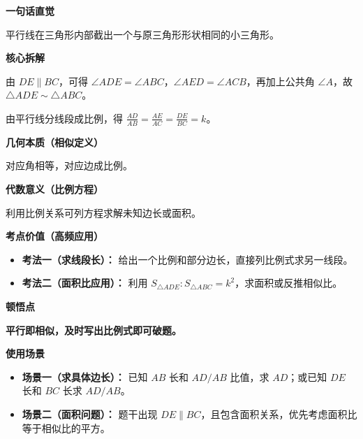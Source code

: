 \begin{explanationbox}

	\textbf{\textcolor{CExplanation}{一句话直觉}}

	平行线在三角形内部截出一个与原三角形形状相同的小三角形。

	\medskip
	\textbf{\textcolor{CExplanation}{核心拆解}}
	\begin{description}[style=nextline, leftmargin=2.8em, labelsep=0.5em, itemsep=0.45em]
		\item[\textbf{要点一（平行得角等）：}] 由 $DE\parallel BC$，可得 $\angle ADE=\angle ABC$，$\angle AED=\angle ACB$，再加上公共角 $\angle A$，故 $\triangle ADE\sim\triangle ABC$。
		\item[\textbf{要点二（比例线段）：}] 由平行线分线段成比例，得 $\frac{AD}{AB}=\frac{AE}{AC}=\frac{DE}{BC}=k$。
	\end{description}

	\medskip
	\textbf{\textcolor{CExplanation}{几何本质（相似定义）}}

	对应角相等，对应边成比例。

	\medskip
	\textbf{\textcolor{CExplanation}{代数意义（比例方程）}}

	利用比例关系可列方程求解未知边长或面积。

	\medskip
	\textbf{\textcolor{CExplanation}{考点价值（高频应用）}}
	\begin{itemize}[leftmargin=*, itemsep=0.5em, topsep=0.4em]
		\item \textbf{考法一（求线段长）：} 给出一个比例和部分边长，直接列比例式求另一线段。
		\item \textbf{考法二（面积比应用）：} 利用 $S_{\triangle ADE}:S_{\triangle ABC}=k^2$，求面积或反推相似比。
	\end{itemize}

	\medskip
	\textbf{\textcolor{CExplanation}{顿悟点}}

	\textbf{平行即相似，及时写出比例式即可破题。}

	\medskip
	\textbf{\textcolor{CExplanation}{使用场景}}
	\begin{itemize}[leftmargin=*, itemsep=0.5em, topsep=0.4em]
		\item \textbf{场景一（求具体边长）：} 已知 $AB$ 长和 $AD/AB$ 比值，求 $AD$；或已知 $DE$ 长和 $BC$ 长求 $AD/AB$。
		\item \textbf{场景二（面积问题）：} 题干出现 $DE\parallel BC$，且包含面积关系，优先考虑面积比等于相似比的平方。
	\end{itemize}
\end{explanationbox}
